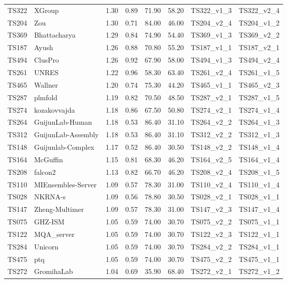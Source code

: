 \begin{longtable}{llllllll}
TS322 & XGroup & 1.30 & 0.89 & 71.90 & 58.20 & TS322\_v1\_3 & TS322\_v2\_4 \\ 
TS204 & Zou & 1.30 & 0.71 & 84.00 & 46.00 & TS204\_v2\_4 & TS204\_v1\_2 \\ 
TS369 & Bhattacharya & 1.29 & 0.84 & 74.90 & 54.40 & TS369\_v1\_3 & TS369\_v2\_2 \\ 
TS187 & Ayush & 1.26 & 0.88 & 70.80 & 55.20 & TS187\_v1\_1 & TS187\_v2\_1 \\ 
TS494 & ClusPro & 1.26 & 0.92 & 67.90 & 58.00 & TS494\_v1\_3 & TS494\_v2\_4 \\ 
TS261 & UNRES & 1.22 & 0.96 & 58.30 & 63.40 & TS261\_v2\_4 & TS261\_v1\_5 \\ 
TS465 & Wallner & 1.20 & 0.74 & 75.30 & 44.20 & TS465\_v1\_1 & TS465\_v2\_3 \\ 
TS287 & plmfold & 1.19 & 0.82 & 70.50 & 48.50 & TS287\_v2\_1 & TS287\_v1\_5 \\ 
TS274 & kozakovvajda & 1.18 & 0.86 & 67.50 & 50.80 & TS274\_v2\_1 & TS274\_v1\_4 \\ 
TS264 & GuijunLab-Human & 1.18 & 0.53 & 86.40 & 31.10 & TS264\_v2\_2 & TS264\_v1\_3 \\ 
TS312 & GuijunLab-Assembly & 1.18 & 0.53 & 86.40 & 31.10 & TS312\_v2\_2 & TS312\_v1\_3 \\ 
TS148 & Guijunlab-Complex & 1.17 & 0.52 & 86.40 & 30.50 & TS148\_v2\_2 & TS148\_v1\_4 \\ 
TS164 & McGuffin & 1.15 & 0.81 & 68.30 & 46.20 & TS164\_v2\_5 & TS164\_v1\_4 \\ 
TS208 & falcon2 & 1.13 & 0.82 & 66.70 & 46.20 & TS208\_v2\_4 & TS208\_v1\_5 \\ 
TS110 & MIEnsembles-Server & 1.09 & 0.57 & 78.30 & 31.00 & TS110\_v2\_4 & TS110\_v1\_4 \\ 
TS028 & NKRNA-s & 1.09 & 0.56 & 78.80 & 30.50 & TS028\_v2\_1 & TS028\_v1\_1 \\ 
TS147 & Zheng-Multimer & 1.09 & 0.57 & 78.30 & 31.00 & TS147\_v2\_3 & TS147\_v1\_4 \\ 
TS075 & GHZ-ISM & 1.05 & 0.59 & 74.00 & 30.70 & TS075\_v2\_2 & TS075\_v1\_1 \\ 
TS122 & MQA\_server & 1.05 & 0.59 & 74.00 & 30.70 & TS122\_v2\_3 & TS122\_v1\_1 \\ 
TS284 & Unicorn & 1.05 & 0.59 & 74.00 & 30.70 & TS284\_v2\_2 & TS284\_v1\_1 \\ 
TS475 & ptq & 1.05 & 0.59 & 74.00 & 30.70 & TS475\_v2\_2 & TS475\_v1\_1 \\ 
TS272 & GromihaLab & 1.04 & 0.69 & 35.90 & 68.40 & TS272\_v2\_1 & TS272\_v1\_2 \\ 

\end{longtable}
